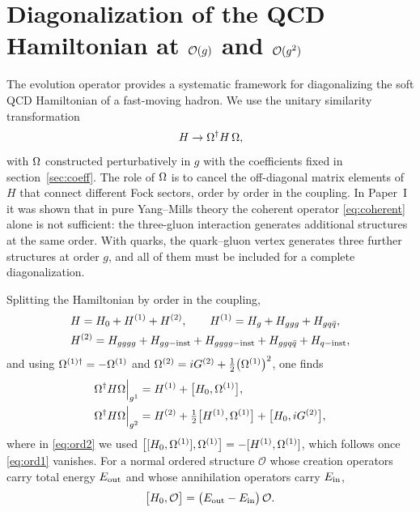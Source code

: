 \section{Diagonalization of the QCD Hamiltonian at $\mathcal{O}(g)$ and $\mathcal{O}(g^{2})$}
\label{sec:diag}

The evolution operator provides a systematic framework for diagonalizing the soft QCD
Hamiltonian of a fast-moving hadron. We use the unitary similarity transformation
\begin{equation}
H\to\Omega^{\dagger}H\,\Omega ,
\label{eq:sim}
\end{equation}
with $\Omega$ constructed perturbatively in $g$ with the coefficients fixed in
section~\ref{sec:coeff}. The role of $\Omega$ is to cancel the off-diagonal matrix elements of $H$
that connect different Fock sectors, order by order in the coupling. In Paper~I it was shown that
in pure Yang--Mills theory the coherent operator \eqref{eq:coherent} alone is not sufficient: the
three-gluon interaction generates additional structures at the same order. With quarks, the
quark--gluon vertex generates three further structures at order $g$, and all of them must be
included for a complete diagonalization.

Splitting the Hamiltonian by order in the coupling,
\begin{align}
&H=H_{0}+H^{(1)}+H^{(2)},\qquad
H^{(1)}=H_{g}+H_{ggg}+H_{gq\bar q},
\nonumber\\
&H^{(2)}=H_{gggg}+H_{gg-{\rm inst}}+H_{gggg-{\rm inst}}+H_{ggq\bar q}+H_{q-{\rm inst}},
\label{eq:Hsplit}
\end{align}
and using $\Omega^{(1)\dagger}=-\Omega^{(1)}$ and $\Omega^{(2)}=iG^{(2)}+\tfrac12\big(\Omega^{(1)}\big)^{2}$, one finds
\begin{align}
\Omega^{\dagger}H\Omega\Big|_{g^{1}}&=H^{(1)}+\big[H_{0},\Omega^{(1)}\big],
\label{eq:ord1}\\
\Omega^{\dagger}H\Omega\Big|_{g^{2}}&=H^{(2)}+\tfrac12\big[H^{(1)},\Omega^{(1)}\big]+\big[H_{0},iG^{(2)}\big],
\label{eq:ord2}
\end{align}
where in \eqref{eq:ord2} we used $\big[[H_{0},\Omega^{(1)}],\Omega^{(1)}\big]=-[H^{(1)},\Omega^{(1)}]$, which
follows once \eqref{eq:ord1} vanishes. For a normal ordered structure $\mathcal O$ whose creation
operators carry total energy $E_{\rm out}$ and whose annihilation operators carry $E_{\rm in}$,
\begin{equation}
\big[H_{0},\mathcal O\big]=\big(E_{\rm out}-E_{\rm in}\big)\,\mathcal O .
\label{eq:H0O}
\end{equation}


